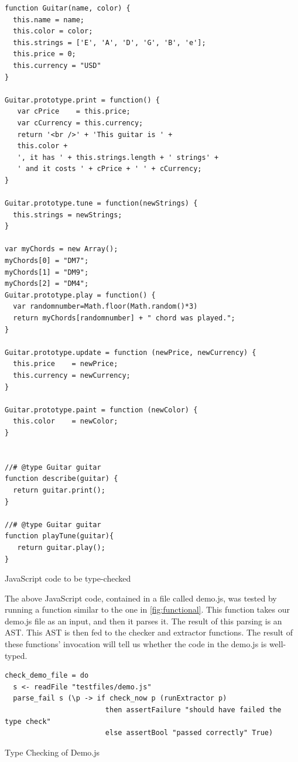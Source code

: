 \documentclass{article}
\begin{document}
\begin{program}
\begin{verbatim}
function Guitar(name, color) {
  this.name = name;
  this.color = color;
  this.strings = ['E', 'A', 'D', 'G', 'B', 'e'];
  this.price = 0;
  this.currency = "USD"
}

Guitar.prototype.print = function() {
   var cPrice    = this.price;
   var cCurrency = this.currency;  
   return '<br />' + 'This guitar is ' +
   this.color +
   ', it has ' + this.strings.length + ' strings' +
   ' and it costs ' + cPrice + ' ' + cCurrency;
}

Guitar.prototype.tune = function(newStrings) {
  this.strings = newStrings;
}

var myChords = new Array();
myChords[0] = "DM7";
myChords[1] = "DM9";
myChords[2] = "DM4"; 
Guitar.prototype.play = function() {
  var randomnumber=Math.floor(Math.random()*3)
  return myChords[randomnumber] + " chord was played.";
}
 
Guitar.prototype.update = function (newPrice, newCurrency) {
  this.price    = newPrice;
  this.currency = newCurrency;
}

Guitar.prototype.paint = function (newColor) {
  this.color    = newColor;
}


//# @type Guitar guitar
function describe(guitar) {
  return guitar.print();
}
 
//# @type Guitar guitar
function playTune(guitar){
   return guitar.play();   
}
\end{verbatim}
\caption{JavaScript code to be type-checked}
\label{fig:demo}
\end{program}
\pagebreak


The above JavaScript code, contained in a file called demo.js, was tested by running
a function similar to the one in \ref{fig:functional}. This function takes our demo.js 
file as an input, and then it parses it. The result of this parsing is an AST. This AST 
is then fed to the checker and extractor functions. The result of these functions' invocation 
will tell us whether the code in the demo.js is well-typed.


\begin{program}
\begin{verbatim}    
check_demo_file = do
  s <- readFile "testfiles/demo.js"
  parse_fail s (\p -> if check_now p (runExtractor p)
                        then assertFailure "should have failed the type check" 
                        else assertBool "passed correctly" True)
\end{verbatim}
\caption{Type Checking of Demo.js}
\label{fig:functional}
\end{program}
\pagebreak
\end{document}
